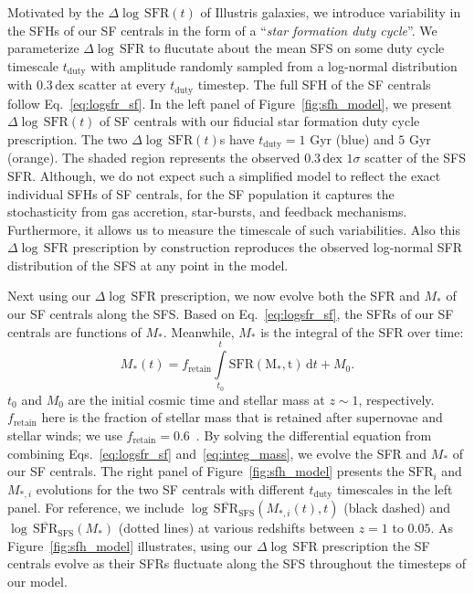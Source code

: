 \documentclass[12pt, letterpaper, preprint, tighten]{aastex}
\newcommand{\beq}{\begin{equation}}
\newcommand{\eeq}{\end{equation}}
\newcommand{\logsfr}{\log \, \mathrm{SFR}}
\newcommand{\musfms}{\log\,\overline{\mathrm{SFR}}_\mathrm{SFS}}
\begin{document}
Motivated by the $\Delta \logsfr(t)$ of Illustris galaxies, we introduce 
variability in the SFHs of our SF centrals in the form of a ``\emph{star 
formation duty cycle}''. We parameterize $\Delta \logsfr$ to flucutate about 
the mean SFS on some duty cycle timescale $t_\mathrm{duty}$ with amplitude
randomly sampled from a log-normal distribution with $0.3\,\mathrm{dex}$ 
scatter at every $t_\mathrm{duty}$ timestep. The full SFH of the SF 
centrals follow Eq.~\ref{eq:logsfr_sf}.
In the left panel of Figure~\ref{fig:sfh_model}, we 
present $\Delta \logsfr(t)$ of SF centrals with our fiducial star formation 
duty cycle prescription. The two $\Delta \logsfr(t)$s have $t_\mathrm{duty}=1$ 
Gyr (blue) and $5$ Gyr (orange). The shaded region represents the observed 
$0.3\,\mathrm{dex}$ $1\sigma$ scatter of the SFS SFR. 
Although, we do not expect such a simplified model to reflect the exact 
individual SFHs of SF centrals, for the SF population it captures the 
stochasticity from gas accretion, star-bursts, and feedback mechanisms.
Furthermore, it allows us to measure the timescale of such variabilities. 
Also this $\Delta \logsfr$ prescription by construction reproduces the 
observed log-normal SFR distribution of the SFS at any point in the model. 

Next using our $\Delta \logsfr$ prescription, we now evolve both the 
SFR and $M_*$ of our SF centrals along the SFS. Based on Eq.~\ref{eq:logsfr_sf},
the SFRs of our SF centrals are functions of $M_*$. Meanwhile, $M_*$ 
is the integral of the SFR over time: 
\beq \label{eq:integ_mass} 
M_*(t) = f_\mathrm{retain} \int\limits_{t_0}^{t} \mathrm{SFR(M_*, t)}\,\mathrm{d}t + M_0. 
\eeq
$t_0$ and $M_0$ are the initial cosmic time and stellar mass at $z \sim 1$, 
respectively. $f_\mathrm{retain}$ here is the fraction of stellar mass 
that is retained after supernovae and stellar winds; we use $f_\mathrm{retain} = 0.6$~\citep{wetzel2013}. 
By solving the differential equation from combining Eqs.~\ref{eq:logsfr_sf} 
and~\ref{eq:integ_mass}, we evolve the SFR and $M_*$ of our SF centrals.  
The right panel of Figure~\ref{fig:sfh_model} presents the $\mathrm{SFR}_i$ 
and $M_{*,i}$ evolutions for the two SF centrals with different 
$t_\mathrm{duty}$ timescales in the left panel. For reference, we include 
$\musfms(M_{*,i}(t), t)$ (black dashed) and $\musfms(M_*)$ 
(dotted lines) at various redshifts between $z = 1$ to $0.05$. As 
Figure~\ref{fig:sfh_model} illustrates, using our $\Delta \logsfr$ 
prescription the SF centrals evolve as their SFRs fluctuate along the SFS 
throughout the timesteps of our model. 
\end{document}
